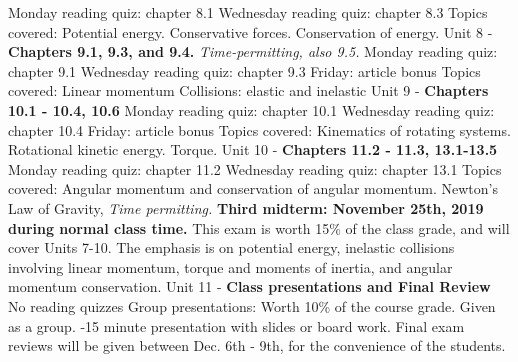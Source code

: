 \documentclass[10pt]{article}
\begin{document}
\begin{outline}[enumerate]
\2 Monday reading quiz: chapter 8.1
\2 Wednesday reading quiz: chapter 8.3
\2 Topics covered:
\3 Potential energy.
\3 Conservative forces.
\3 Conservation of energy.
\1 Unit 8 - \textbf{Chapters 9.1, 9.3, and 9.4.} \textit{Time-permitting, also 9.5.}
\2 Monday reading quiz: chapter 9.1
\2 Wednesday reading quiz: chapter 9.3
\2 Friday: article bonus
\2 Topics covered:
\3 Linear momentum
\3 Collisions: elastic and inelastic
\1 Unit 9 - \textbf{Chapters 10.1 - 10.4, 10.6}
\2 Monday reading quiz: chapter 10.1
\2 Wednesday reading quiz: chapter 10.4
\2 Friday: article bonus
\2 Topics covered:
\3 Kinematics of rotating systems.
\3 Rotational kinetic energy.
\3 Torque.
\1 Unit 10 - \textbf{Chapters 11.2 - 11.3, 13.1-13.5}
\2 Monday reading quiz: chapter 11.2
\2 Wednesday reading quiz: chapter 13.1
\2 Topics covered:
\3 Angular momentum and conservation of angular momentum.
\3 Newton's Law of Gravity, \textit{Time permitting.}
\1 \textbf{Third midterm: November 25th, 2019 during normal class time.}  This exam is worth 15\% of the class grade, and will cover Units 7-10. The emphasis is on potential energy, inelastic collisions involving linear momentum, torque and moments of inertia, and angular momentum conservation.
\1 Unit 11 - \textbf{Class presentations and Final Review}
\2 No reading quizzes
\2 Group presentations:
\3 Worth 10\% of the course grade.
\3 Given as a group.
-15 minute presentation with slides or board work.
\3 Final exam reviews will be given between Dec. 6th - 9th, for the convenience of the students.
\end{outline}
\end{document}
